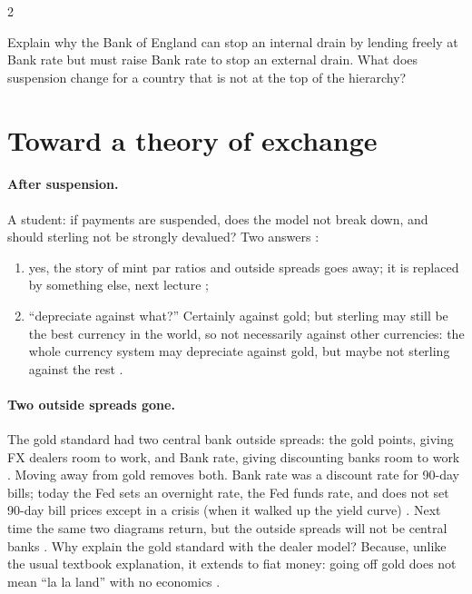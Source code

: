 \begin{paracol}{2}
\begin{exercise}
Explain why the Bank of England can stop an internal drain by lending freely at Bank rate but must raise Bank rate to stop an external drain. What does suspension
change for a country that is not at the top of the hierarchy?
\end{exercise}

\section{Toward a theory of exchange}\label{sec:gl-theory}

\paragraph{After suspension.} A student: if payments are suspended, does the model not break down, and should sterling not be strongly devalued? Two answers
:
\begin{enumerate}
  \item yes, the story of mint par ratios and outside spreads goes away; it is replaced by something else, next lecture ;
  \item ``depreciate against what?'' Certainly against gold; but sterling may still be the best currency in the world, so not necessarily against other
        currencies: the whole currency system may depreciate against gold, but maybe not sterling against the rest .
\end{enumerate}

\paragraph{Two outside spreads gone.} The gold standard had two central bank outside spreads: the gold points, giving FX dealers room to work, and Bank rate,
giving discounting banks room to work . Moving away from gold removes both. Bank rate was a discount rate for 90-day bills; today
the Fed sets an overnight rate, the Fed funds rate, and does not set 90-day bill prices except in a crisis (when it walked up the yield curve)
. Next time the same two diagrams return, but the outside spreads will not be central banks
. Why explain the gold standard with the dealer model? Because, unlike the usual textbook explanation, it extends to fiat money: going off gold
does not mean ``la la land'' with no economics .


\end{paracol}
